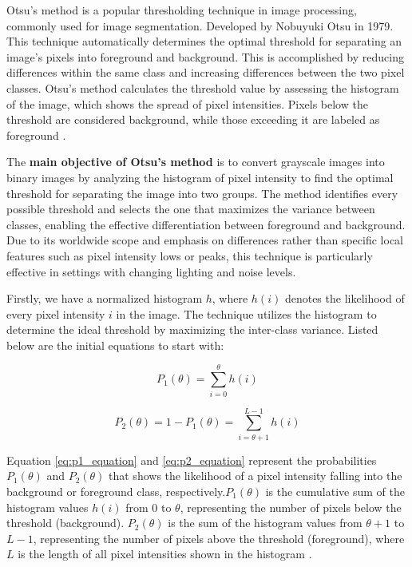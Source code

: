 \documentclass[%
	a4paper, %
	12pt, %
	english, %
	bibtotoc %
]{scrartcl}
\begin{document}
Otsu's method is a popular thresholding technique in image processing, commonly used for image segmentation. Developed by Nobuyuki Otsu in 1979. This technique automatically determines the optimal threshold for separating an image's pixels into foreground and background. This is accomplished by reducing differences within the same class and increasing differences between the two pixel classes. Otsu's method calculates the threshold value by assessing the histogram of the image, which shows the spread of pixel intensities. Pixels below the threshold are considered background, while those exceeding it are labeled as foreground \cite{otsu}.

The \textbf{main objective of Otsu's method} is to convert  grayscale images into binary images by analyzing the histogram of pixel intensity to find the optimal threshold for separating the image into two groups. The method identifies every possible threshold and selects the one that maximizes the variance between classes, enabling the effective differentiation between foreground and background. Due to its worldwide scope and emphasis on differences rather than specific local features such as pixel intensity lows or peaks, this technique is particularly effective in settings with changing lighting and noise levels.

Firstly, we have a normalized histogram \( h\), where \( h(i) \) denotes the likelihood of every pixel intensity \( i \) in the image. The technique utilizes the histogram to determine the ideal threshold by maximizing the inter-class variance. Listed below are the initial equations to start with:

\begin{equation}
P_1(\theta) = \sum_{i=0}^{\theta} h(i)
\label{eq:p1_equation}
\end{equation}

\begin{equation}
P_2(\theta) = 1 - P_1(\theta) = \sum_{i=\theta+1}^{L-1} h(i)
\label{eq:p2_equation}
\end{equation}

Equation \ref{eq:p1_equation} and \ref{eq:p2_equation}  represent the probabilities \( P_1(\theta) \) and \( P_2(\theta) \) that shows the likelihood of a pixel intensity falling into the background or foreground class, respectively.\( P_1(\theta) \) is the cumulative sum of the histogram values \( h(i) \) from 0 to \( \theta \), representing the number of pixels below the threshold (background). \( P_2(\theta) \) is the sum of the histogram values from \( \theta+1 \) to \( L-1 \), representing the number of pixels above the threshold (foreground), where \( L\) is the length of all pixel intensities shown in the histogram .
\end{document}

